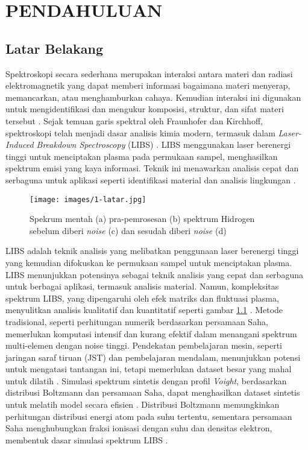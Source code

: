 




\chapter{PENDAHULUAN}



\section{Latar Belakang}


\par  Spektroskopi secara sederhana merupakan  interaksi antara materi dan radiasi elektromagnetik yang dapat memberi informasi bagaimana materi menyerap, memancarkan, atau menghamburkan cahaya. Kemudian interaksi ini  digunakan untuk mengidentifikasi dan mengukur komposisi, struktur, dan sifat materi tersebut \parencite{Hollas2013}.  
Sejak temuan garis spektral oleh Fraunhofer dan Kirchhoff, spektroskopi telah menjadi dasar analisis kimia modern, termasuk dalam \textit{Laser-Induced Breakdown Spectroscopy} (LIBS) \parencite{Thorne1999}. LIBS menggunakan laser berenergi tinggi untuk menciptakan plasma pada permukaan sampel, menghasilkan spektrum emisi yang kaya informasi. Teknik ini menawarkan analisis cepat dan serbaguna untuk aplikasi seperti identifikasi material dan analisis lingkungan \parencite{Thorne1999}.
\begin{figure}[h]
    \centering
    \texttt{[image: images/1-latar.jpg]}
    \caption{Spekrum mentah (a) pra-pemrosesan (b) spektrum Hidrogen sebelum diberi \textit{noise} (c) dan sesudah diberi \textit{noise} (d) \citep{Gasior2023}}
    \label{fig:kenapa}
\end{figure}

\par LIBS adalah teknik analisis yang melibatkan penggunaan laser berenergi tinggi yang kemudian difokuskan ke permukaan sampel untuk menciptakan plasma. LIBS menunjukkan potensinya sebagai teknik analisis yang cepat dan serbaguna untuk berbagai aplikasi, termasuk analisis material. Namun, kompleksitas spektrum LIBS, yang dipengaruhi oleh efek matriks dan fluktuasi plasma, menyulitkan analisis kualitatif dan kuantitatif seperti gambar \ref{fig:kenapa} \parencite{Gasior2023}. Metode tradisional, seperti perhitungan numerik berdasarkan persamaan Saha, memerlukan komputasi intensif dan kurang efektif dalam menangani spektrum multi-elemen dengan noise tinggi. Pendekatan pembelajaran mesin, seperti jaringan saraf tiruan (JST) dan pembelajaran mendalam, menunjukkan potensi untuk mengatasi tantangan ini, tetapi memerlukan dataset besar yang mahal untuk dilatih \parencite{Gasior2023}. Simulasi spektrum sintetis dengan profil \textit{Voight}, berdasarkan distribusi Boltzmann dan persamaan Saha, dapat menghasilkan dataset sintetis untuk melatih model secara efisien \parencite{Pan2024}. Distribusi Boltzmann memungkinkan perhitungan distribusi energi atom pada suhu tertentu, sementara persamaan Saha menghubungkan fraksi ionisasi dengan suhu dan densitas elektron, membentuk dasar simulasi spektrum LIBS \parencite{Thorne1999}.

